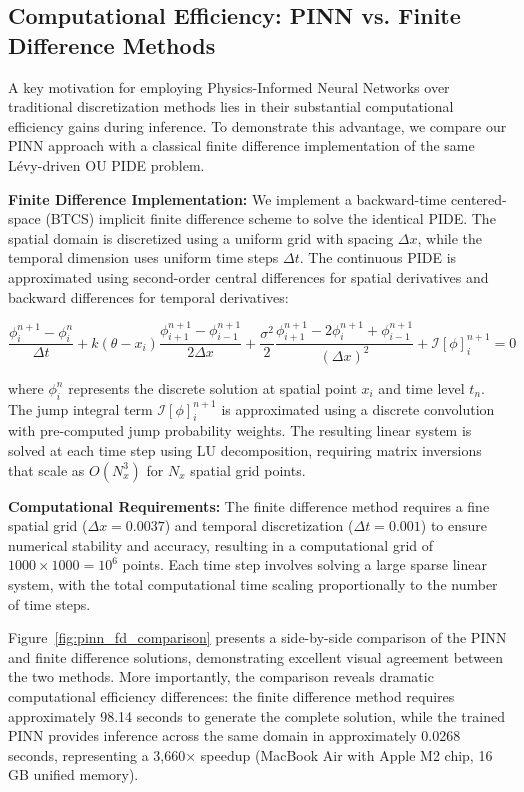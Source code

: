 \documentclass[11pt,twoside,openright]{report}
\begin{document}
\subsection{Computational Efficiency: PINN vs. Finite Difference Methods}
\label{sec:computational_efficiency}

A key motivation for employing Physics-Informed Neural Networks over traditional discretization methods lies in their substantial computational efficiency gains during inference. To demonstrate this advantage, we compare our PINN approach with a classical finite difference implementation of the same Lévy-driven OU PIDE problem.

\textbf{Finite Difference Implementation:} We implement a backward-time centered-space (BTCS) implicit finite difference scheme to solve the identical PIDE. The spatial domain is discretized using a uniform grid with spacing $\Delta x$, while the temporal dimension uses uniform time steps $\Delta t$. The continuous PIDE is approximated using second-order central differences for spatial derivatives and backward differences for temporal derivatives:

$$
\frac{\phi_{i}^{n+1} - \phi_{i}^{n}}{\Delta t} + k(\theta - x_i)\frac{\phi_{i+1}^{n+1} - \phi_{i-1}^{n+1}}{2\Delta x} + \frac{\sigma^2}{2}\frac{\phi_{i+1}^{n+1} - 2\phi_{i}^{n+1} + \phi_{i-1}^{n+1}}{(\Delta x)^2} + \mathcal{I}[\phi]_i^{n+1} = 0
$$

where $\phi_{i}^{n}$ represents the discrete solution at spatial point $x_i$ and time level $t_n$. The jump integral term $\mathcal{I}[\phi]_i^{n+1}$ is approximated using a discrete convolution with pre-computed jump probability weights. The resulting linear system is solved at each time step using LU decomposition, requiring matrix inversions that scale as $O(N_x^3)$ for $N_x$ spatial grid points.

\textbf{Computational Requirements:} The finite difference method requires a fine spatial grid ($\Delta x = 0.0037$) and temporal discretization ($\Delta t = 0.001$) to ensure numerical stability and accuracy, resulting in a computational grid of $1000 \times 1000 = 10^6$ points. Each time step involves solving a large sparse linear system, with the total computational time scaling proportionally to the number of time steps.

Figure~\ref{fig:pinn_fd_comparison} presents a side-by-side comparison of the PINN and finite difference solutions, demonstrating excellent visual agreement between the two methods. More importantly, the comparison reveals dramatic computational efficiency differences: the finite difference method requires approximately 98.14 seconds to generate the complete solution, while the trained PINN provides inference across the same domain in approximately 0.0268 seconds, representing a 3,660× speedup (MacBook Air with Apple M2 chip, 16 GB unified memory).
\end{document}
